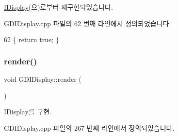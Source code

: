 \mbox{\hyperlink{class_i_display_ad717007b624f0a8e7c830ab803cd8a92}{I\+Display}}(으)로부터 재구현되었습니다.



G\+D\+I\+Display.\+cpp 파일의 62 번째 라인에서 정의되었습니다.


\begin{DoxyCode}
62 \{ \textcolor{keywordflow}{return} \textcolor{keyword}{true}; \}
\end{DoxyCode}
\mbox{\label{class_g_d_i_display_a7c83b043ba5d2058b8419053615ffabc}} 
\subsubsection{\texorpdfstring{render()}{render()}}
{\footnotesize\ttfamily void G\+D\+I\+Display\+::render (\begin{DoxyParamCaption}{ }\end{DoxyParamCaption})\hspace{0.3cm}{\ttfamily [virtual]}}



\mbox{\hyperlink{class_i_display_af61c440b97da313a502e86346a729b03}{I\+Display}}를 구현.



G\+D\+I\+Display.\+cpp 파일의 267 번째 라인에서 정의되었습니다.


